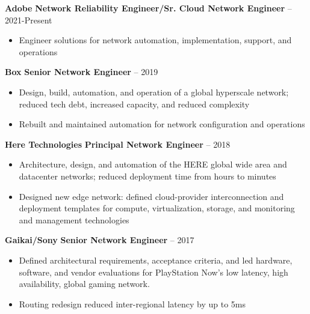 \documentclass[11pt]{article}
\newcommand{\job}[3]{
    \begingroup
        \textbf{\small#1} \hfill \textbf{\small#2} \--- \color{black!70}\small{#3}
    \endgroup
}
\newcommand{\spacevv}{
    \vspace{2mm}
}
\begin{document}
\begin{paracol}{2}
{      \job{Adobe}{Network Reliability Engineer/Sr. Cloud Network Engineer}{2021\--Present}
      \begin{itemize}
        \item Engineer solutions for network automation, implementation, support, and operations
      \end{itemize}
      \spacevv{}

      \job{Box}{Senior Network Engineer}{2019}
      \begin{itemize}
        \item Design, build, automation, and operation of a global hyperscale network; reduced tech debt, increased
            capacity, and reduced complexity
        \item Rebuilt and maintained automation for network configuration and operations
      \end{itemize}

    \job{Here Technologies}{Principal Network Engineer}{2018}
    \begin{itemize}
        \item Architecture, design, and automation of the HERE global wide area and datacenter networks; reduced
            deployment time from hours to minutes
        \item Designed new edge network: defined cloud-provider interconnection and deployment templates for compute,
            virtualization, storage, and monitoring and management technologies
    \end{itemize}
    \spacevv{}

    \job{Gaikai/Sony}{Senior Network Engineer}{2017}
    \begin{itemize}
        \item Defined architectural requirements, acceptance criteria, and led hardware, software, and vendor
            evaluations for PlayStation Now's low latency, high availability, global gaming network.
        \item Routing redesign reduced inter-regional latency by up to 5ms
    \end{itemize}
    \spacevv{}

}
\end{paracol}
\end{document}
